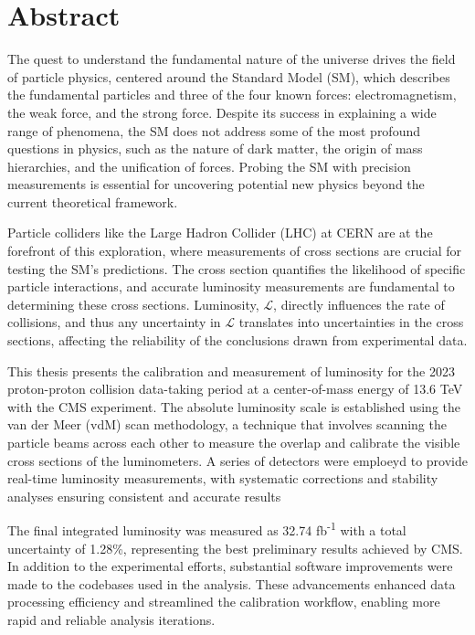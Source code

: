 \chapter*{Abstract}

The quest to understand the fundamental nature of the universe drives the field of particle physics, centered around the Standard Model (SM), which describes the fundamental particles and three of the four known forces: electromagnetism, the weak force, and the strong force. Despite its success in explaining a wide range of phenomena, the SM does not address some of the most profound questions in physics, such as the nature of dark matter, the origin of mass hierarchies, and the unification of forces. Probing the SM with precision measurements is essential for uncovering potential new physics beyond the current theoretical framework.

Particle colliders like the Large Hadron Collider (LHC) at CERN are at the forefront of this exploration, where measurements of cross sections are crucial for testing the SM’s predictions. The cross section quantifies the likelihood of specific particle interactions, and accurate luminosity measurements are fundamental to determining these cross sections. Luminosity, \(\mathcal{L}\), directly influences the rate of collisions, and thus any uncertainty in \(\mathcal{L}\) translates into uncertainties in the cross sections, affecting the reliability of the conclusions drawn from experimental data.

This thesis presents the calibration and measurement of luminosity for the 2023 proton-proton collision data-taking period at a center-of-mass energy of 13.6 TeV with the CMS experiment. The absolute luminosity scale is established using the van der Meer (vdM) scan methodology, a technique that involves scanning the particle beams across each other to measure the overlap and calibrate the visible cross sections of the luminometers. A series of detectors were emploeyd to provide real-time luminosity measurements, with systematic corrections and stability analyses ensuring consistent and accurate results

The final integrated luminosity was measured as 32.74 fb\textsuperscript{-1} with a total uncertainty of 1.28\%, representing the best preliminary results achieved by CMS. In addition to the experimental efforts, substantial software improvements were made to the codebases used in the analysis. These advancements enhanced data processing efficiency and streamlined the calibration workflow, enabling more rapid and reliable analysis iterations.

